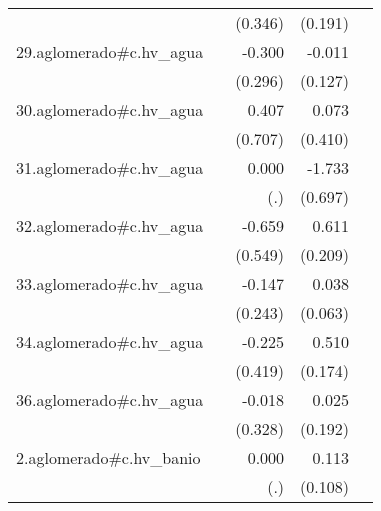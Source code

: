 {\begin{longtable}{l*{4}{D{.}{.}{-1}}}
            &                     &     (0.346)         &     (0.191)         &                     \\
\addlinespace
29.aglomerado#c.hv\_agua&                     &      -0.300         &      -0.011         &                     \\
            &                     &     (0.296)         &     (0.127)         &                     \\
\addlinespace
30.aglomerado#c.hv\_agua&                     &       0.407         &       0.073         &                     \\
            &                     &     (0.707)         &     (0.410)         &                     \\
\addlinespace
31.aglomerado#c.hv\_agua&                     &       0.000         &      -1.733\sym{*}  &                     \\
            &                     &         (.)         &     (0.697)         &                     \\
\addlinespace
32.aglomerado#c.hv\_agua&                     &      -0.659         &       0.611\sym{**} &                     \\
            &                     &     (0.549)         &     (0.209)         &                     \\
\addlinespace
33.aglomerado#c.hv\_agua&                     &      -0.147         &       0.038         &                     \\
            &                     &     (0.243)         &     (0.063)         &                     \\
\addlinespace
34.aglomerado#c.hv\_agua&                     &      -0.225         &       0.510\sym{**} &                     \\
            &                     &     (0.419)         &     (0.174)         &                     \\
\addlinespace
36.aglomerado#c.hv\_agua&                     &      -0.018         &       0.025         &                     \\
            &                     &     (0.328)         &     (0.192)         &                     \\
\addlinespace
2.aglomerado#c.hv\_banio&                     &       0.000         &       0.113         &                     \\
            &                     &         (.)         &     (0.108)         &                     \\

\end{longtable}}
